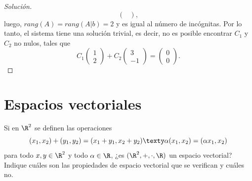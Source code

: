 \documentclass[a4,11pt]{aleph-notas}
\begin{document}
\begin{proof}[Solución]
\[\begin{pmatrix}
    \end{pmatrix},
    \]
    luego, $rang(A)= rang(A|b)= 2$ y es igual al número de incógnitas. Por lo tanto, el sistema tiene una solución trivial, es decir, no es posible encontrar $C_1$ y $C_2$ no nulos, tales que
    \[
C_1 \begin{pmatrix} 1 \\ 2 \end{pmatrix} + C_2 \begin{pmatrix} 3 \\ -1 \end{pmatrix} = \begin{pmatrix} 0 \\ 0 \end{pmatrix}.
\]
\end{proof}

\section{Espacios vectoriales}

\begin{ejer}
    Si en $\R^2$ se definen las operaciones
\[
(x_1,x_2) + (y_1,y_2) = (x_1+y_1,x_2+y_2) \texty \alpha(x_1,x_2) = (\alpha x_1,x_2)
\]
para todo $x,y\in\R^2$ y todo $\alpha\in\R$, ¿es $(\R^2,+,\cdot,\R)$ un espacio vectorial? Indique cuáles son las propiedades de espacio vectorial que se verifican y cuáles no.
\end{ejer}
\end{document}
